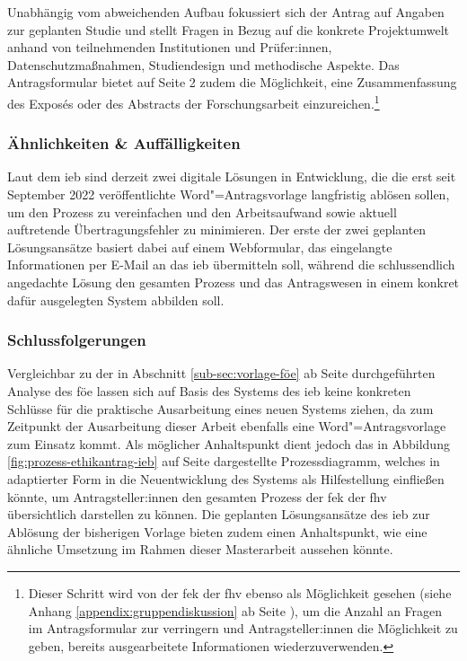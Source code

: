 \documentclass[a4paper,12pt,twoside]{scrreprt}
\begin{document}
\medskip

Unabhängig vom abweichenden Aufbau fokussiert sich der Antrag auf Angaben zur geplanten Studie und stellt Fragen in Bezug auf die konkrete Projektumwelt anhand von teilnehmenden Institutionen und Prüfer:innen, Datenschutzmaßnahmen, Studiendesign und methodische Aspekte. Das Antragsformular bietet auf Seite 2 zudem die Möglichkeit, eine Zusammenfassung des Exposés oder des Abstracts der Forschungsarbeit einzureichen.\footnote{Dieser Schritt wird von der \ac{fek} der \ac{fhv} ebenso als Möglichkeit gesehen (siehe Anhang \ref{appendix:gruppendiskussion} ab Seite \pageref{appendix:gruppendiskussion}), um die Anzahl an Fragen im Antragsformular zur verringern und Antragsteller:innen die Möglichkeit zu geben, bereits ausgearbeitete Informationen wiederzuverwenden.}

\subsubsection*{Ähnlichkeiten \& Auffälligkeiten}
\label{sub-sub-sec:ähnlichkeiten-auffälligkeiten-fh-oö}

Laut dem \ac{ieb} sind derzeit zwei digitale Lösungen in Entwicklung, die die erst seit September 2022 veröffentlichte Word"=Antragsvorlage langfristig ablösen sollen, um den Prozess zu vereinfachen und den Arbeitsaufwand sowie aktuell auftretende Übertragungsfehler zu minimieren. Der erste der zwei geplanten Lösungsansätze basiert dabei auf einem Webformular, das eingelangte Informationen per E-Mail an das \ac{ieb} übermitteln soll, während die schlussendlich angedachte Lösung den gesamten Prozess und das Antragswesen in einem konkret dafür ausgelegten System abbilden soll. \cite{rosendahl-huber_extern-erfahrungen_2023}

\subsubsection*{Schlussfolgerungen}
\label{sub-sub-sec:schlussfolgerungen-fh-oö}

Vergleichbar zu der in Abschnitt \ref{sub-sec:vorlage-föe} ab Seite \pageref{sub-sec:vorlage-föe} durchgeführten Analyse des \ac{föe} lassen sich auf Basis des Systems des \ac{ieb} keine konkreten Schlüsse für die praktische Ausarbeitung eines neuen Systems ziehen, da zum Zeitpunkt der Ausarbeitung dieser Arbeit ebenfalls eine Word"=Antragsvorlage zum Einsatz kommt. Als möglicher Anhaltspunkt dient jedoch das in Abbildung \ref{fig:prozess-ethikantrag-ieb} auf Seite \pageref{fig:prozess-ethikantrag-ieb} dargestellte Prozessdiagramm, welches in adaptierter Form in die Neuentwicklung des Systems als Hilfestellung einfließen könnte, um Antragsteller:innen den gesamten Prozess der \ac{fek} der \ac{fhv} übersichtlich darstellen zu können. Die geplanten Lösungsansätze des \ac{ieb} zur Ablösung der bisherigen Vorlage bieten zudem einen Anhaltspunkt, wie eine ähnliche Umsetzung im Rahmen dieser Masterarbeit aussehen könnte.
\end{document}
